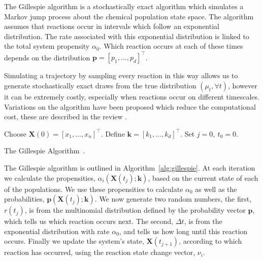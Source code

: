 \documentclass[final]{siamltex}
\begin{document}
The Gillespie algorithm is a stochastically exact algorithm which simulates a Markov jump process about the chemical population state space. The algorithm assumes that reactions occur in intervals which follow an exponential distribution. The rate associated with this exponential distribution is linked to the total system propensity $\alpha_0$. Which reaction occurs at each of these times depends on the distribution $\mathbf{p} = [p_1, \dots, p_d]^\top$.

Simulating a trajectory by sampling every reaction in this way allows us to generate stochastically exact draws from the true distribution $(\mu_t, \forall t)$, however it can be extremely costly, especially when reactions occur on different timescales. Variations on the algorithm have been proposed which reduce the computational cost, these are described in the review \cite{gillespie2007stochastic}.

\begin{table}[!htpb]
\centering
\begin{algorithm}[H]
\DontPrintSemicolon
\BlankLine
	Choose $\mathbf{X}(0) = [x_1, \ldots, x_n]^\top$.\;
	Define $\mathbf{k} = [k_1, \ldots, k_d]^\top$.\;
	Set $j= 0,\ t_0 = 0$.\;
\caption{The Gillespie Algorithm~\cite{gillespie2007stochastic}.\label{alg:gillespie}}
\end{algorithm}
\end{table}

The Gillespie algorithm is outlined in Algorithm~\ref{alg:gillespie}. At each iteration we calculate the propensities, $\alpha_i(\mathbf{X}(t_j);\mathbf{k})$, based on the current state of each of the populations. We use these propensities to calculate $\alpha_0$ as well as the probabilities, $\mathbf{p}(\mathbf{X}(t_j); \mathbf{k})$. We now generate two random numbers, the first, $r(t_j)$, is from the multinomial distribution defined by the probability vector $\mathbf{p}$, which tells us which reaction occurs next. The second, $\Delta t$, is from the exponential distribution with rate $\alpha_0$, and tells us how long until this reaction occurs. Finally we update the system's state, $\mathbf{X}(t_{j+1})$, according to which reaction has occurred, using the reaction state change vector, $\nu_i$.
\end{document}
